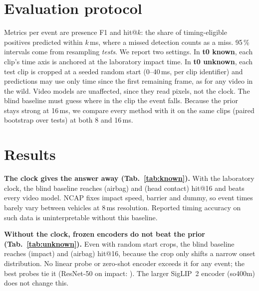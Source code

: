 \documentclass[10pt,twocolumn]{article}
\begin{document}
\section{Evaluation protocol}
Metrics per event are presence F1 and hit@$k$: the share of timing-eligible positives predicted
within $k$\,ms, where a missed detection counts as a miss. 95\,\% intervals come from resampling
\emph{tests}. We report two settings.
In \textbf{t0 known}, each clip's time axis is anchored at the laboratory impact time.
In \textbf{t0 unknown}, each test clip is cropped at a seeded random start (0--40\,ms, per clip
identifier) and predictions may use only time since the first remaining frame, as for any video
in the wild. Video models are unaffected, since they read pixels, not the clock. The blind
baseline must guess where in the clip the event falls. Because the prior stays strong at 16\,ms,
we compare every method with it on the same clips (paired bootstrap over tests) at both 8 and
16\,ms.

\section{Results}
\begin{table}[t]\centering\small
\caption{Hit@16 on the test split, \textbf{t0 known}. The blind baseline uses no video.}
\label{tab:known}
\resizebox{\columnwidth}{!}{}
\end{table}
\begin{table}[t]\centering\small
\caption{Hit@16 on the test split, \textbf{t0 unknown} (random start crops). ``--'': no prompt
defined for that event.}
\label{tab:unknown}
\resizebox{\columnwidth}{!}{}
\end{table}

\textbf{The clock gives the answer away (Tab.~\ref{tab:known}).} With the laboratory clock,
the blind baseline reaches \BlindAirbagKnown{} (airbag) and \BlindHeadKnown{} (head contact)
hit@16 and beats every video model. NCAP fixes impact speed, barrier and dummy, so event times
barely vary between vehicles at 8\,ms resolution. Reported timing accuracy on such data is
uninterpretable without this baseline.

\textbf{Without the clock, frozen encoders do not beat the prior (Tab.~\ref{tab:unknown}).}
Even with random start crops, the blind baseline reaches \BlindImpactUnknown{} (impact) and
\BlindAirbagUnknown{} (airbag) hit@16, because the crop only shifts a narrow onset distribution.
No linear probe or zero-shot encoder exceeds it for any event; the best probes tie it (ResNet-50
on impact: \ResnetImpactUnknown{}). The larger SigLIP~2 encoder (so400m) does not change this.
\end{document}
